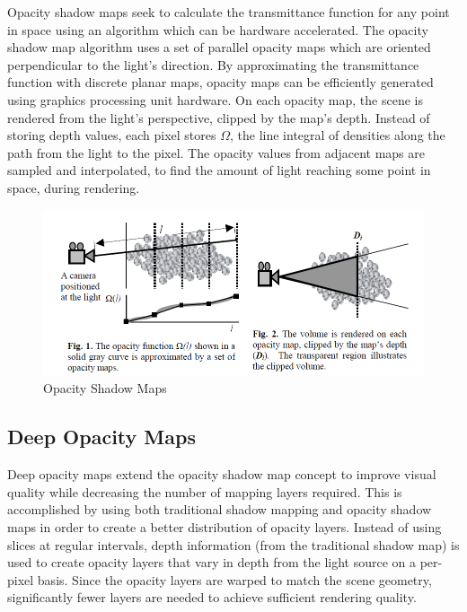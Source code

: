 \documentclass{article}
\begin{document}
Opacity shadow maps \cite{Kim01opacityshadow} seek to calculate the transmittance function for any point in space using an algorithm which can be hardware accelerated. The opacity shadow map algorithm uses a set of parallel opacity maps which are oriented perpendicular to the light's direction. By approximating the transmittance function with discrete planar maps, opacity maps can be efficiently generated using graphics processing unit hardware. On each opacity map, the scene is rendered from the light's perspective, clipped by the map's depth. Instead of storing depth values, each pixel stores $\Omega$, the line integral of densities along the path from the light to the pixel. The opacity values from adjacent maps are sampled and interpolated, to find the amount of light reaching some point in space, during rendering.

\begin{figure}[h!]
	\centering
	\includegraphics[scale=0.5]{Images/OpacityShadowMaps}
	\caption{Opacity Shadow Maps}
\end{figure}

\subsection{Deep Opacity Maps}

Deep opacity maps \cite{deepopacitymaps08} extend the opacity shadow map concept to improve visual quality while decreasing the number of mapping layers required. This is accomplished by using both traditional shadow mapping and opacity shadow maps in order to create a better distribution of opacity layers. Instead of using slices at regular intervals, depth information (from the traditional shadow map) is used to create opacity layers that vary in depth from the light source on a per-pixel basis. Since the opacity layers are warped to match the scene geometry, significantly fewer layers are needed to achieve sufficient rendering quality.
\end{document}
